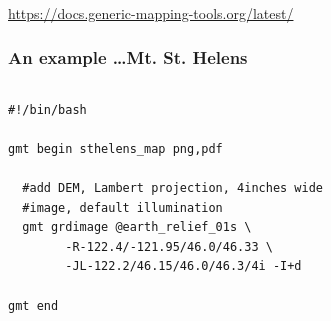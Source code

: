 \documentclass[unknownkeysallowed]{beamer}
\begin{document}
\begin{frame}
\frametitle{}
	\begin{center}
		\url{https://docs.generic-mapping-tools.org/latest/}
	\end{center}
\end{frame}

\begin{frame}[fragile=singleslide]
\frametitle{An example \dots Mt. St. Helens}
	\begin{columns}[t]
		\tiny{
		\begin{verbatim}
#!/bin/bash

gmt begin sthelens_map png,pdf

  #add DEM, Lambert projection, 4inches wide 
  #image, default illumination
  gmt grdimage @earth_relief_01s \
        -R-122.4/-121.95/46.0/46.33 \
        -JL-122.2/46.15/46.0/46.3/4i -I+d

gmt end		
		\end{verbatim}
}
		\begin{center}
		\end{center}
	\end{columns}
\end{frame}
\end{document}
